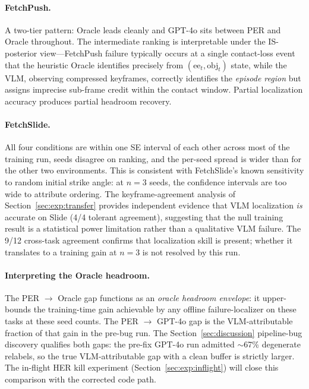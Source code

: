 \documentclass{article}
\begin{document}
\paragraph{FetchPush.}
A two-tier pattern: Oracle leads cleanly and GPT-4o sits between PER and
Oracle throughout. The intermediate ranking is interpretable under the
IS-posterior view---FetchPush failure typically occurs at a single contact-loss
event that the heuristic Oracle identifies precisely from $(\text{ee}_t,\text{obj}_t)$
state, while the VLM, observing compressed keyframes, correctly identifies the
\emph{episode region} but assigns imprecise sub-frame credit within the contact
window. Partial localization accuracy produces partial headroom recovery.

\paragraph{FetchSlide.}
All four conditions are within one SE interval of each other across most of the
training run, seeds disagree on ranking, and the per-seed spread is wider than
for the other two environments. This is consistent with FetchSlide's known
sensitivity to random initial strike angle: at $n\!=\!3$ seeds, the confidence
intervals are too wide to attribute ordering. The keyframe-agreement analysis of
Section~\ref{sec:exp:transfer} provides independent evidence that VLM localization
\emph{is} accurate on Slide (4/4 tolerant agreement), suggesting that the null
training result is a statistical power limitation rather than a qualitative VLM
failure. The 9/12 cross-task agreement confirms that localization skill is present;
whether it translates to a training gain at $n\!=\!3$ is not resolved by this run.

\paragraph{Interpreting the Oracle headroom.}
The PER $\to$ Oracle gap functions as an \emph{oracle headroom envelope}: it
upper-bounds the training-time gain achievable by any offline failure-localizer
on these tasks at these seed counts. The PER $\to$ GPT-4o gap is the
VLM-attributable fraction of that gain in the pre-bug run. The
Section~\ref{sec:discussion} pipeline-bug discovery qualifies both gaps:
the pre-fix GPT-4o run admitted $\sim$67\% degenerate relabels, so the
true VLM-attributable gap with a clean buffer is strictly larger. The in-flight
HER kill experiment (Section~\ref{sec:exp:inflight}) will close this comparison
with the corrected code path.
\end{document}
